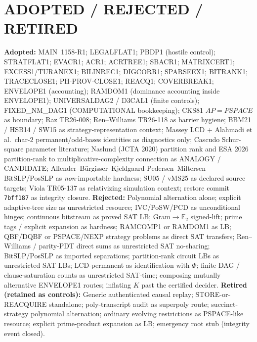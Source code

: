 \documentclass[11pt]{article}
\begin{document}
\section*{ADOPTED / REJECTED / RETIRED}
\textbf{Adopted:} MAIN~1158-R1; LEGALFLAT1; PBDP1 (hostile control); STRATFLAT1; EVACR1;
ACR1; ACRTREE1; SBACR1; MATRIXCERT1; EXCESS1/TURANEX1; BILINREC1; DIGCORR1; SPARSEEX1;
BITRANK1; TRACECLOSE1; PH-PROV-CLOSE1; REACQ1; COVERBREAK1; ENVELOPE1 (accounting);
RAMDOM1 (dominance accounting inside ENVELOPE1); UNIVERSALDAG2 / D3CAL1 (finite controls);
FIXED\_NM\_DAG1 (COMPUTATIONAL bookkeeping); CKS81 $AP=PSPACE$ as boundary;
Raz TR26-008; Ren--Williams TR26-118 as barrier hygiene; BBM21 / HSB14 / SW15 as
strategy-representation context; Massey LCD + Alahmadi et al.\ char-$2$ permanent/odd-bases
identities as diagnostics only; Cascudo Schur-square parameter literature; Naslund
(JCTA 2020) partition rank and ESA 2026 partition-rank to multiplicative-complexity
connection as ANALOGY / CANDIDATE; Allender--B\"urgisser--Kjeldgaard-Pedersen--Miltersen
BitSLP/PosSLP as \emph{non}-importable hardness; SU05 / vMS25 as declared source targets;
Viola TR05-137 as relativizing simulation context; restore commit \texttt{7bff187} as
integrity closure.
\textbf{Rejected:} Polynomial alternation alone; explicit adaptive-tree size as unrestricted
resource; IVC/PoSW/PCD as unconditional hinges; continuous bitstream as proved SAT LB;
Gram$\to\mathbb F_2$ signed-lift; prime tags / explicit expansion as hardness;
RAMCOMP1 or RAMDOM1 as LB; QBF/DQBF or PSPACE/NEXP strategy problems as direct SAT transfers;
Ren--Williams / parity-PDT direct sums as unrestricted SAT no-sharing; BitSLP/PosSLP as
imported separations; partition-rank circuit LBs as unrestricted SAT LBs; LCD-permanent as
identification with $\Phi$; finite DAG / clause-saturation counts as unrestricted SAT-time;
composing mutually alternative ENVELOPE1 routes; inflating $K$ past the certified decider.
\textbf{Retired (retained as controls):} Generic authenticated causal replay; STORE-or-REACQUIRE
standalone; poly-transcript audit as superpoly route; succinct-strategy polynomial
alternation; ordinary evolving restrictions as PSPACE-like resource; explicit prime-product
expansion as LB; emergency root stub (integrity event closed).
\end{document}
